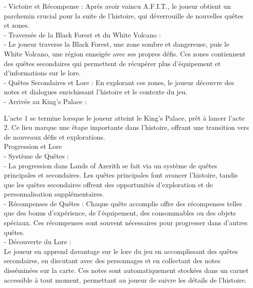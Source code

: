   - Victoire et Récompense : Après avoir vaincu A.F.I.T., le joueur obtient un parchemin crucial pour la suite de l'histoire, qui déverrouille de nouvelles quêtes et zones. 
  \\
 

  

- Traversée de la Black Forest et du White Volcano : 
\\
 

  - Le joueur traverse la Black Forest, une zone sombre et dangereuse, puis le White Volcano, une région enneigée avec ses propres défis. Ces zones contiennent des quêtes secondaires qui permettent de récupérer plus d'équipement et d'informations sur le lore. 
  \\
 

  - Quêtes Secondaires et Lore : En explorant ces zones, le joueur découvre des notes et dialogues enrichissant l'histoire et le contexte du jeu. 
  \\
 
 

- Arrivée au King's Palace : 

 L'acte 1 se termine lorsque le joueur atteint le King's Palace, prêt à lancer l'acte 2. Ce lieu marque une étape importante dans l'histoire, offrant une transition vers de nouveaux défis et explorations. 
 \\
 

  

Progression et Lore 
\\
 

  

- Système de Quêtes : 
\\
 

  - La progression dans Lands of Azerith se fait via un système de quêtes principales et secondaires. Les quêtes principales font avancer l'histoire, tandis que les quêtes secondaires offrent des opportunités d'exploration et de personnalisation supplémentaires. 
  \\
 

  - Récompenses de Quêtes : Chaque quête accomplie offre des récompenses telles que des bonus d'expérience, de l'équipement, des consommables ou des objets spéciaux. Ces récompenses sont souvent nécessaires pour progresser dans d'autres quêtes. 
  \\
 

  

- Découverte du Lore : 
\\
 

  Le joueur en apprend davantage sur le lore du jeu en accomplissant des quêtes secondaires, en discutant avec des personnages et en collectant des notes disséminées sur la carte. Ces notes sont automatiquement stockées dans un carnet accessible à tout moment, permettant au joueur de suivre les détails de l'histoire. 
  \\
 


